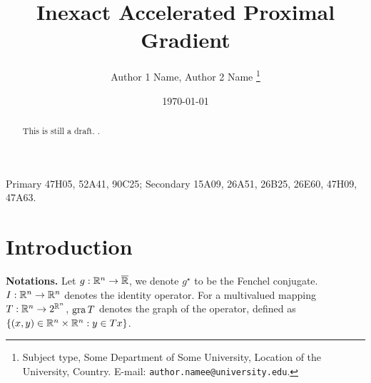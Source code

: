 \documentclass[12pt]{article}
\title{{\fontfamily{ptm}\selectfont Inexact Accelerated Proximal Gradient }}
\author{
    Author 1 Name, Author 2 Name
    \thanks{
        Subject type, Some Department of Some University, Location of the University,
        Country. E-mail: \texttt{author.namee@university.edu}.
    }
}
\begin{document}
\date{\today}
\maketitle
{}
\begin{abstract} 
    \noindent
    This is still a draft. \cite{zhang_robust_2022}. 
\end{abstract}
Primary 47H05, 52A41, 90C25; Secondary 15A09, 26A51, 26B25, 26E60, 47H09, 47A63.

\section{Introduction}
    \textbf{Notations.}
    Let $g: \mathbb R^n \rightarrow\overline {\mathbb R}$, we denote $g^\star$ to be the Fenchel conjugate. 
    $I: \mathbb R^n \rightarrow \mathbb R^n$ denotes the identity operator.
    For a multivalued mapping $T: \mathbb R^n \rightarrow 2^{\mathbb R^n}$, $\operatorname{gra} T$ denotes the graph of the operator, defined as $\{(x, y)\in \mathbb R^n \times \mathbb R^n : y \in Tx\}$. 
\end{document}
